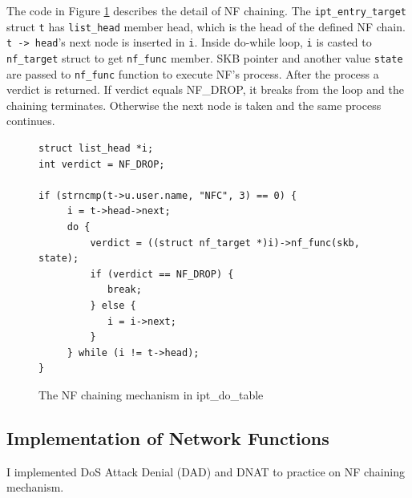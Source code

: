 The code in Figure \ref{fig: nf_chaining_code} describes the detail of NF chaining. The {\tt ipt\_entry\_target} struct {\tt t} has {\tt list\_head} member head, which is the head of the defined NF chain. {\tt t -\verb#># head}'s next node is inserted in {\tt i}. Inside do-while loop, {\tt i} is casted to {\tt nf\_target} struct to get {\tt nf\_func} member. SKB pointer and another value {\tt state} are passed to {\tt nf\_func} function to execute NF's process. After the process a verdict is returned. If verdict equals NF\_DROP, it breaks from the loop and the chaining terminates. Otherwise the next node is taken and the same process continues. 

\begin{figure}
	\begin{center}
		\begin{screen}
			\begin{verbatim}
struct list_head *i;
int verdict = NF_DROP;

if (strncmp(t->u.user.name, "NFC", 3) == 0) {
     i = t->head->next;
     do {
         verdict = ((struct nf_target *)i)->nf_func(skb, state);
         if (verdict == NF_DROP) {
            break;
         } else {
            i = i->next;
         }
     } while (i != t->head);
}
			\end{verbatim}	
		\end{screen}
	\end{center}
	\caption{The NF chaining mechanism in ipt\_do\_table}
	\label{fig: nf_chaining_code}	
\end{figure}

\subsection{Implementation of Network Functions}
I implemented DoS Attack Denial (DAD) and DNAT to practice on NF chaining mechanism.

